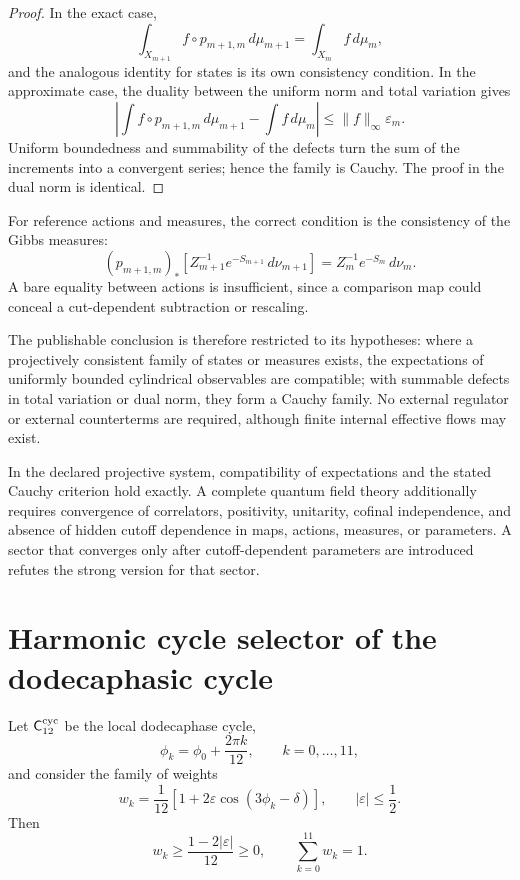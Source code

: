 \begin{proof}
In the exact case,
\[
 \int_{X_{m+1}}f\circ p_{m+1,m}\,d\mu_{m+1}
 =\int_{X_m}f\,d\mu_m,
\]
and the analogous identity for states is its own consistency condition.
In the approximate case, the duality between the uniform norm and total
variation gives
\[
 \left|
 \int f\circ p_{m+1,m}\,d\mu_{m+1}
 -\int f\,d\mu_m
 \right|
 \leq \|f\|_\infty\varepsilon_m.
\]
Uniform boundedness and summability of the defects turn the sum of the
increments into a convergent series; hence the family is Cauchy. The proof in
the dual norm is identical.
\end{proof}

For reference actions and measures, the correct condition is the consistency of the Gibbs measures:
\[
 (p_{m+1,m})_\ast
 \left[
 Z_{m+1}^{-1}e^{-S_{m+1}}\,d\nu_{m+1}
 \right]
 =
 Z_m^{-1}e^{-S_m}\,d\nu_m.
\]
A bare equality between actions is insufficient, since a comparison map
could conceal a cut-dependent subtraction or rescaling.

The publishable conclusion is therefore restricted to its hypotheses:
where a projectively consistent family of states or measures exists,
the expectations of uniformly bounded cylindrical observables are
compatible; with summable defects in total variation or dual norm, they form
a Cauchy family. No external regulator or external counterterms are
required, although finite internal effective flows may exist.

In the declared projective system, compatibility of expectations and the stated Cauchy criterion hold exactly. A complete quantum field theory additionally requires convergence of correlators, positivity, unitarity, cofinal independence, and absence of hidden cutoff dependence in maps, actions, measures, or parameters. A sector that converges only after cutoff-dependent parameters are introduced refutes the strong version for that sector.

\section{Harmonic cycle selector of the dodecaphasic cycle}
\label{sec:selector-armonico-c12}

Let \(\mathsf C_{12}^{\rm cyc}\) be the local dodecaphase cycle,
\[
 \phi_k=\phi_0+\frac{2\pi k}{12},
 \qquad k=0,\ldots,11,
\]
and consider the family of weights
\[
 w_k=\frac1{12}
 \left[1+2\varepsilon\cos(3\phi_k-\delta)\right],
 \qquad |\varepsilon|\leq\frac12.
\]
Then
\[
 w_k\geq\frac{1-2|\varepsilon|}{12}\geq0,
 \qquad
 \sum_{k=0}^{11}w_k=1.
\]


